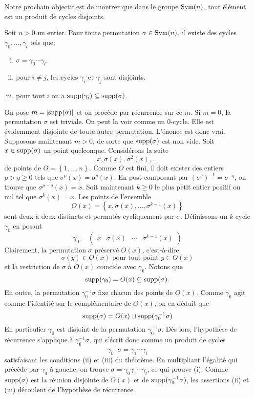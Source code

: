 \documentclass[french]{book}
\begin{document}
Notre prochain objectif est de montrer que dans le groupe $\operatorname{Sym}(n)$, tout élément est un produit de cycles disjoints.
\begin{theoreme}
  Soit $n>0$ un entier. Pour toute permutation $\sigma \in \operatorname{Sym}(n)$, il existe des cycles $\gamma_0, \dots, \gamma_l$ tels que:
  \begin{enumerate}[(i)]
    \item $\sigma = \gamma_0 \cdots \gamma_l$.
    \item pour $i \not = j$, les cycles $\gamma_i$ et $\gamma_j$ sont disjoints.
    \item pour tout $i$ on a $\operatorname{supp}(\gamma_i) \subseteq \operatorname{supp}(\sigma)$.
  \end{enumerate}
  \tcblower
  \begin{preuve}
    On pose $m = \lvert\operatorname{supp}(\sigma)\rvert$ et on procède par récurrence sur ce $m$.
    \newline Si $m=0$, la permutation $\sigma$ est triviale. On peut la voir comme un 0-cycle. Elle est évidemment disjointe de toute autre permutation. L'énonce est donc vrai.
    \newline Supposons maintenant $m>0$, de sorte que $\operatorname{supp}(\sigma)$ est non vide. Soit $x \in \operatorname{supp}(\sigma)$ un point quelconque. Considérons la suite $$x, \sigma(x), \sigma^2(x), \dots$$ de points de $O = \left\{ 1, \dots, n \right\}$. Comme $O$ est fini, il doit exister des entiers $p > q \geq 0$ tels que $\sigma^p(x) = \sigma^q(x)$. En post-composant par $(\sigma^q)^{-1} = \sigma^{-q}$, on trouve que $\sigma^{p-q}(x) = x$. Soit maintenant $k \geq 0$ le plus petit entier positif ou nul tel que $\sigma^k(x)=x$. Les points de l'ensemble
    $$O(x) = \left\{ x, \sigma(x), \dots, \sigma^{k-1}(x) \right\}$$ 
sont deux à deux distincts et permutés cycliquement par $\sigma$. Définissons un $k$-cycle $\gamma_0$ en posant
$$\gamma_0 = \begin{pmatrix} x & \sigma(x) & \cdots & \sigma^{k-1}(x) \end{pmatrix}$$
Clairement, la permutation $\sigma$ préservé $O(x)$, c'est-à-dire
$$\sigma(y) \in O(x) \text{ pour tout point } y \in O(x)$$
et la restriction de $\sigma$ à $O(x)$ coïncide avec $\gamma_0$. Notons que
$$\operatorname{supp}(\gamma_0) = O(x) \subseteq \operatorname{supp}(\sigma).$$
En outre, la permutation $\gamma^{-1}_0 \sigma$ fixe chacun des points de $O(x)$. Comme $\gamma_0$ agit comme l'identité sur le complémentaire de $O(x)$, on en déduit que
$$\operatorname{supp}(\sigma) = O(x) \sqcup \operatorname{supp}(\gamma^{-1}_0 \sigma) $$
En particulier $\gamma_0$ est disjoint de la permutation $\gamma^{-1}_0 \sigma$. Dès lors, l'hypothèse de récurrence s'applique à $\gamma^{-1}_0 \sigma$, qui s'écrit donc comme un produit de cycles
$$\gamma^{-1}_0 \sigma = \gamma_1 \cdots \gamma_l$$
satisfaisant les conditions (ii) et (iii) du théorème. En multipliant l'égalité qui précède par $\gamma_0$ à gauche, on trouve $\sigma = \gamma_0 \gamma_1 \cdots \gamma_l$, ce qui prouve (i). Comme $\operatorname{supp}(\sigma)$ est la réunion disjointe de $O(x)$ et de $\operatorname{supp}(\gamma^{-1}_0 \sigma)$, les assertions (ii) et (iii) découlent de l'hypothèse de récurrence.
  \end{preuve}
\end{theoreme}
\end{document}
